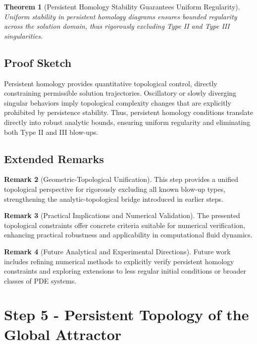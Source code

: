 \documentclass[11pt]{article}
\newtheorem{theorem}{Theorem}[section]
\theoremstyle{definition}
\newtheorem{remark}[theorem]{Remark}
\begin{document}
\begin{theorem}[Persistent Homology Stability Guarantees Uniform Regularity]
Uniform stability in persistent homology diagrams ensures bounded regularity across the solution domain, thus rigorously excluding Type II and Type III singularities.
\end{theorem}

\subsection*{Proof Sketch}
Persistent homology provides quantitative topological control, directly constraining permissible solution trajectories. Oscillatory or slowly diverging singular behaviors imply topological complexity changes that are explicitly prohibited by persistence stability. Thus, persistent homology conditions translate directly into robust analytic bounds, ensuring uniform regularity and eliminating both Type II and III blow-ups.

\subsection*{Extended Remarks}
\begin{remark}[Geometric-Topological Unification]
This step provides a unified topological perspective for rigorously excluding all known blow-up types, strengthening the analytic-topological bridge introduced in earlier steps.
\end{remark}

\begin{remark}[Practical Implications and Numerical Validation]
The presented topological constraints offer concrete criteria suitable for numerical verification, enhancing practical robustness and applicability in computational fluid dynamics.
\end{remark}

\begin{remark}[Future Analytical and Experimental Directions]
Future work includes refining numerical methods to explicitly verify persistent homology constraints and exploring extensions to less regular initial conditions or broader classes of PDE systems.
\end{remark}


\section{Step 5 - Persistent Topology of the Global Attractor}
\label{sec:step5}
\end{document}
